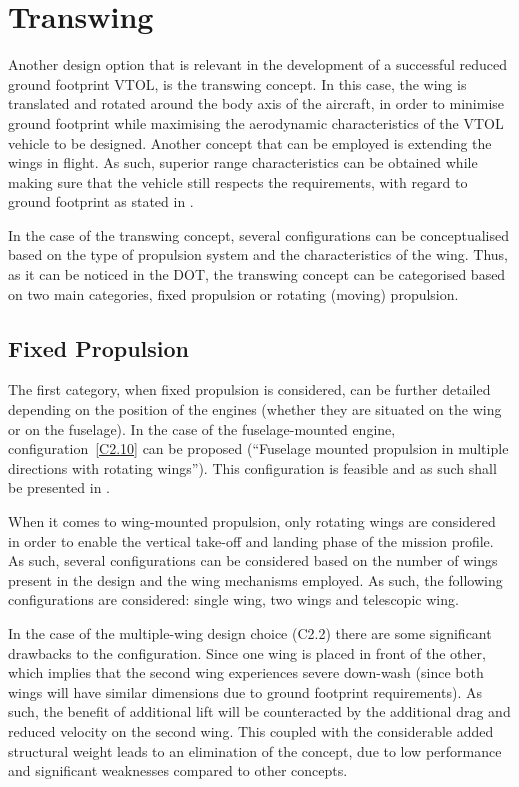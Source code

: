 \section{Transwing}
\label{sec:DesignOptions_Transwing}
Another design option that is relevant in the development of a successful reduced ground footprint VTOL, is the transwing concept.
In this case, the wing is translated and rotated around the body axis of the aircraft, in order to minimise ground footprint while maximising the aerodynamic characteristics of the VTOL vehicle to be designed.
Another concept that can be employed is extending the wings in flight.
 As such, superior range characteristics can be obtained while making sure that the vehicle still respects the requirements, with regard to ground footprint as stated in .

In the case of the transwing concept, several configurations can be conceptualised based on the type of propulsion system and the characteristics of the wing.
Thus, as it can be noticed in the DOT, the transwing concept can be categorised based on two main categories, fixed propulsion or rotating (moving) propulsion.

\subsection{Fixed Propulsion}
The first category, when fixed propulsion is considered, can be further detailed depending on the position of the engines (whether they are situated on the wing or on the fuselage).
In the case of the fuselage-mounted engine, configuration~\ref{C2.10} can be proposed (\enquote{Fuselage mounted propulsion in multiple directions with rotating wings}). This configuration is feasible and as such shall be presented in .

When it comes to wing-mounted propulsion, only rotating wings are considered in order to enable the vertical take-off and landing phase of the mission profile.
As such, several configurations can be considered based on the number of wings present in the design and the wing mechanisms employed.
As such, the following configurations are considered: single wing, two wings and telescopic wing.

In the case of the multiple-wing design choice (C2.2) there are some significant drawbacks to the configuration.
Since one wing is placed in front of the other, which implies that the second wing experiences severe down-wash (since both wings will have similar dimensions due to ground footprint requirements).
As such, the benefit of additional lift will be counteracted by the additional drag and reduced velocity on the second wing.
This coupled with the considerable added structural weight leads to an elimination of the concept, due to low performance and significant weaknesses compared to other concepts.

